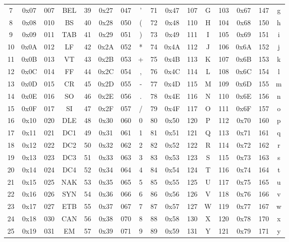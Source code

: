 \documentclass[a4paper, 12pt]{scrartcl} %
\begin{document}
\begin{itemize}
\begin{table}[H]
\begin{center}
{\begin{tabular}{|c|c|c|c||c|c|c|c||c|c|c|c||c|c|c|c|}
            7 & 0x07 & 007 & BEL & 39 & 0x27 & 047 & ' & 71 & 0x47 & 107 & G & 103 & 0x67 & 147 & g \\
            8 & 0x08 & 010 & BS & 40 & 0x28 & 050 & ( & 72 & 0x48 & 110 & H & 104 & 0x68 & 150 & h \\
            9 & 0x09 & 011 & TAB & 41 & 0x29 & 051 &  ) & 73 & 0x49 & 111 & I & 105 & 0x69 & 151 & i \\
            10 & 0x0A & 012 & LF & 42 & 0x2A & 052 & * & 74 & 0x4A & 112 & J & 106 & 0x6A & 152 & j \\
            11 & 0x0B & 013 & VT & 43 & 0x2B & 053 & + & 75 & 0x4B & 113 & K & 107 & 0x6B & 153 & k \\
            12 & 0x0C & 014 & FF & 44 & 0x2C & 054 & , & 76 & 0x4C & 114 & L & 108 & 0x6C & 154 & l \\
            13 & 0x0D & 015 & CR & 45 & 0x2D & 055 & - & 77 & 0x4D & 115 & M & 109 & 0x6D & 155 & m \\
            14 & 0x0E & 016 & SO & 46 & 0x2E & 056 & . & 78 & 0x4E & 116 & N & 110 & 0x6E & 156 & n \\ 
            15 & 0x0F & 017 & SI & 47 & 0x2F & 057 & / & 79 & 0x4F & 117 & O & 111 & 0x6F & 157 & o \\
            16 & 0x10 & 020 & DLE & 48 & 0x30 & 060 & 0 & 80 & 0x50 & 120 & P & 112 & 0x70 & 160 & p \\
            17 & 0x11 & 021 & DC1 & 49 & 0x31 & 061 & 1 & 81 & 0x51 & 121 & Q & 113 & 0x71 & 161 & q \\
            18 & 0x12 & 022 & DC2 & 50 & 0x32 & 062 & 2 & 82 & 0x52 & 122 & R & 114 & 0x72 & 162 & r \\
            19 & 0x13 & 023 & DC3 & 51 & 0x33 & 063 & 3 & 83 & 0x53 & 123 & S & 115 & 0x73 & 163 & s \\
            20 & 0x14 & 024 & DC4 & 52 & 0x34 & 064 & 4 & 84 & 0x54 & 124 & T & 116 & 0x74 & 164 & t \\
            21 & 0x15 & 025 & NAK & 53 & 0x35 & 065 & 5 & 85 & 0x55 & 125 & U & 117 & 0x75 & 165 & u \\
            22 & 0x16 & 026 & SYN & 54 & 0x36 & 066 & 6 & 86 & 0x56 & 126 & V & 118 & 0x76 & 166 & v \\
            23 & 0x17 & 027 & ETB & 55 & 0x37 & 067 & 7 & 87 & 0x57 & 127 & W & 119 & 0x77 & 167 & w \\
            24 & 0x18 & 030 & CAN & 56 & 0x38 & 070 & 8 & 88 & 0x58 & 130 & X & 120 & 0x78 & 170 & x \\
            25 & 0x19 & 031 & EM & 57 & 0x39 & 071 & 9 & 89 & 0x59 & 131 & Y & 121 & 0x79 & 171 & y \\

\end{tabular}}
\end{center}
\end{table}
\end{itemize}
\end{document}
